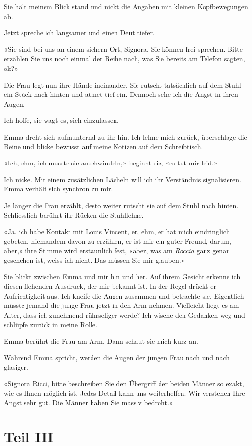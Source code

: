 Sie hält meinem Blick stand und nickt die Angaben mit kleinen
Kopfbewegungen ab.

Jetzt spreche ich langsamer und einen Deut tiefer.

«Sie sind bei uns an einem sichern Ort, Signora. Sie können frei
sprechen. Bitte erzählen Sie uns noch einmal der Reihe nach, was Sie
bereits am Telefon sagten, ok?»

Die Frau legt nun ihre Hände ineinander. Sie rutscht tatsächlich auf dem
Stuhl ein Stück nach hinten und atmet tief ein. Dennoch sehe ich die
Angst in ihren Augen.

Ich hoffe, sie wagt es, sich einzulassen.

Emma dreht sich aufmunternd zu ihr hin. Ich lehne mich zurück,
überschlage die Beine und blicke bewusst auf meine Notizen auf dem
Schreibtisch.

«Ich, ehm, ich musste sie anschwindeln,» beginnt sie, «es tut mir leid.»

Ich nicke. Mit einem zusätzlichen Lächeln will ich ihr Verständnis
signalisieren. Emma verhält sich synchron zu mir.

Je länger die Frau erzählt, desto weiter rutscht sie auf dem Stuhl nach
hinten. Schliesslich berührt ihr Rücken die Stuhllehne.

«Ja, ich habe Kontakt mit Louis Vincent, er, ehm, er hat mich
eindringlich gebeten, niemandem davon zu erzählen, er ist mir ein guter
Freund, darum, aber,» ihre Stimme wird erstaunlich fest, «aber, was am
\emph{Roccia} ganz genau geschehen ist, weiss ich nicht. Das müssen Sie
mir glauben.»

Sie blickt zwischen Emma und mir hin und her. Auf ihrem Gesicht erkenne
ich diesen flehenden Ausdruck, der mir bekannt ist. In der Regel drückt
er Aufrichtigkeit aus. Ich kneife die Augen zusammen und betrachte sie.
Eigentlich müsste jemand die junge Frau jetzt in den Arm nehmen.
Vielleicht liegt es am Alter, dass ich zunehmend rührseliger werde? Ich
wische den Gedanken weg und schlüpfe zurück in meine Rolle.

Emma berührt die Frau am Arm. Dann schaut sie mich kurz an.

Während Emma spricht, werden die Augen der jungen Frau nach und nach
glasiger.

«Signora Ricci, bitte beschreiben Sie den Übergriff der beiden Männer so
exakt, wie es Ihnen möglich ist. Jedes Detail kann uns weiterhelfen. Wir
verstehen Ihre Angst sehr gut. Die Männer haben Sie massiv bedroht.»

\part{\texorpdfstring{Teil III }{Teil III }}\label{teil-iii}

